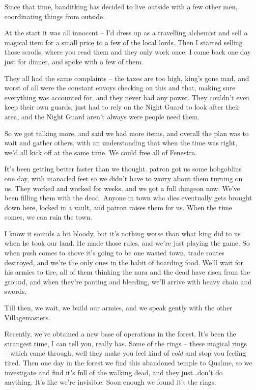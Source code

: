 Since that time, \gls{banditking} has decided to live outside with a few other men, coordinating things from outside.

\begin{speechtext}
At the start it was all innocent -- I'd dress up as a travelling alchemist and sell a magical item for a small price to a few of the local lords.  Then I started selling those scrolls, where you read them and they only work once.  I came back one day just for dinner, and spoke with a few of them.

They all had the same complaints -- the taxes are too high, \gls{king}'s gone mad, and worst of all were the constant envoys checking on this and that, making sure everything was accounted for, and they never had any power.  They couldn't even keep their own guards, just had to rely on the Night Guard to look after their area, and the Night Guard aren't always were people need them.

So we got talking more, and said we had more items, and overall the plan was to wait and gather others, with an understanding that when the time was right, we'd all kick off at the same time.  We could free all of Fenestra.

It's been getting better faster than we thought.  \Gls{patron} got us some hobgoblins one day, with manacled feet so we didn't have to worry about them turning on us.  They worked and worked for weeks, and we got a full dungeon now.  We've been filling them with the dead.  Anyone in town who dies eventually gets brought down here, locked in a vault, and \gls{patron} raises them for us.  When the time comes, we can ruin the town.

I know it sounds a bit bloody, but it's nothing worse than what \gls{king} did to us when he took our land.  He made those rules, and we're just playing the game.  So when push comes to shove it's going to be one wasted town, trade routes destroyed, and we're the only ones in the habit of hoarding food.  We'll wait for his armies to tire, all of them thinking the nura and the dead have risen from the ground, and when they're panting and bleeding, we'll arrive with heavy chain and swords.

Till then, we wait, we build our armies, and we speak gently with the other Villagemasters.

Recently, we've obtained a new base of operations in the forest.  It's been the strangest time, I can tell you, really has.  Some of the rings -- these magical rings -- which came through, well they make you feel kind of \emph{cold} and stop you feeling tired.  Then one day in the forest we find this abandoned temple to Qualme, so we investigate and find it's full of the walking dead, and they just\ldots don't do anything.  It's like we're invisible.  Soon enough we found it's the rings.


\end{speechtext}
